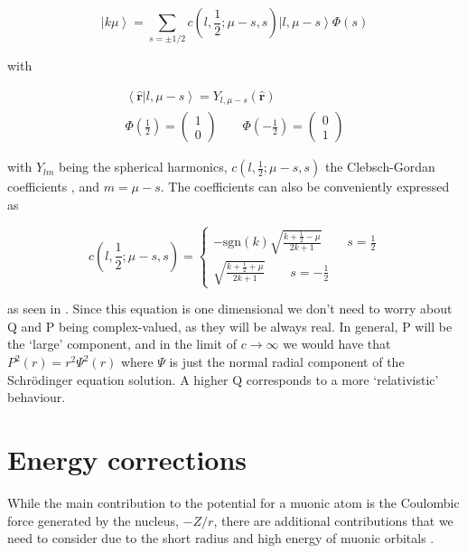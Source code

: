 \documentclass[]{report}
\newcommand{\ket}[1]{\left|#1\right>}
\begin{document}
\begin{equation}\label{dirac_kmu}
\ket{k\mu} = \sum_{s=\pm 1/2} c(l,\frac{1}{2};\mu-s, s)\left|l,\mu-s\right>\Phi(s)
\end{equation}

with

\begin{align}\label{dirac_spharm}
\left<\mathbf{\hat{r}}|l,\mu-s\right> = Y_{l,\mu-s}(\mathbf{\hat{r}}) \\
\Phi\left(\frac{1}{2}\right) = \begin{pmatrix}
1 \\
0
\end{pmatrix}
\qquad
\Phi\left(-\frac{1}{2}\right) = \begin{pmatrix}
0 \\
1
\end{pmatrix} 
\end{align}

with $Y_{lm}$ being the spherical harmonics, $c(l,\frac{1}{2};\mu-s, s)$ the Clebsch-Gordan coefficients \cite{weinb2008}, and $m=\mu-s$. The coefficients can also be conveniently expressed as

\begin{equation}\label{dirac_cgsym}
c(l,\frac{1}{2};\mu-s, s) = \begin{cases}
-\mathrm{sgn}(k)\sqrt{\frac{k+\frac{1}{2}-\mu}{2k+1}} \qquad s = \frac{1}{2} \\
\sqrt{\frac{k+\frac{1}{2}+\mu}{2k+1}} \qquad s = -\frac{1}{2}
\end{cases}
\end{equation}


as seen in \cite{gross1999, biedernharn1981}.\newline
Since this equation is one dimensional we don't need to worry about Q and P being complex-valued, as they will be always real. In general, P will be the `large' component, and in the limit of $c \rightarrow \infty$ we would have that $P^2(r) = r^2\Psi^2(r)$ where $\Psi$ is just the normal radial component of the Schr\"{o}dinger equation solution. A higher Q corresponds to a more `relativistic' behaviour.

\section{Energy corrections}

While the main contribution to the potential for a muonic atom is the Coulombic force generated by the nucleus, $-Z/r$, there are additional contributions that we need to consider due to the short radius and high energy of muonic orbitals \cite{borie1982}.
\end{document}
